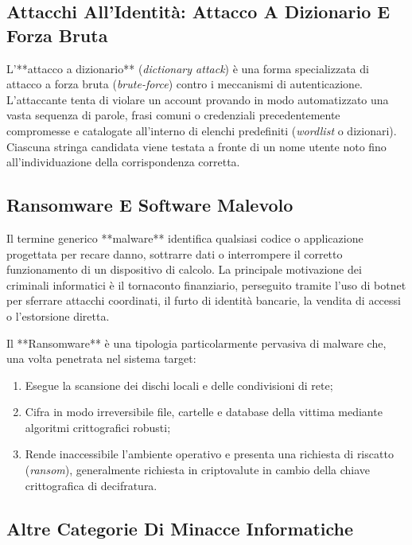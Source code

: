 \documentclass[11pt, a4paper]{article}
\begin{document}
\subsection{Attacchi All'Identità: Attacco A Dizionario E Forza Bruta}

L'**attacco a dizionario** (\emph{dictionary attack}) è una forma specializzata di attacco a forza bruta (\emph{brute-force}) contro i meccanismi di autenticazione. L'attaccante tenta di violare un account provando in modo automatizzato una vasta sequenza di parole, frasi comuni o credenziali precedentemente compromesse e catalogate all'interno di elenchi predefiniti (\emph{wordlist} o dizionari). Ciascuna stringa candidata viene testata a fronte di un nome utente noto fino all'individuazione della corrispondenza corretta.

\subsection{Ransomware E Software Malevolo}

Il termine generico **malware** identifica qualsiasi codice o applicazione progettata per recare danno, sottrarre dati o interrompere il corretto funzionamento di un dispositivo di calcolo. La principale motivazione dei criminali informatici è il tornaconto finanziario, perseguito tramite l'uso di botnet per sferrare attacchi coordinati, il furto di identità bancarie, la vendita di accessi o l'estorsione diretta.

Il **Ransomware** è una tipologia particolarmente pervasiva di malware che, una volta penetrata nel sistema target:
\begin{enumerate}[noitemsep]
    \item Esegue la scansione dei dischi locali e delle condivisioni di rete;
    \item Cifra in modo irreversibile file, cartelle e database della vittima mediante algoritmi crittografici robusti;
    \item Rende inaccessibile l'ambiente operativo e presenta una richiesta di riscatto (\emph{ransom}), generalmente richiesta in criptovalute in cambio della chiave crittografica di decifratura.
\end{enumerate}

\subsection{Altre Categorie Di Minacce Informatiche}
\end{document}
